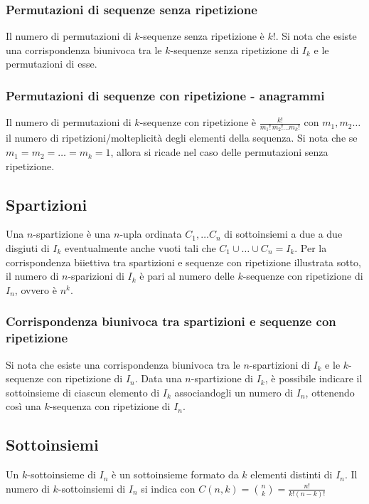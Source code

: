 \documentclass[a4paper]{article}
\begin{document}
\subsubsection*{Permutazioni di sequenze senza ripetizione}
Il numero di permutazioni di \(k\)-sequenze senza ripetizione è \(k!\). Si nota che esiste una corrispondenza biunivoca tra le
\(k\)-sequenze senza ripetizione di \(I_k\) e le permutazioni di esse.

\subsubsection*{Permutazioni di sequenze con ripetizione - anagrammi}
Il numero di permutazioni di \(k\)-sequenze con ripetizione è \(\frac{k!}{m_1 \!! \, m_2\!! \dots m_k\!!}\) con \(m_1, m_2\dots\)
il numero di ripetizioni/molteplicità degli elementi della sequenza. Si nota che se \(m_1 = m_2 = \dots = m_k = 1\), allora si
ricade nel caso delle permutazioni senza ripetizione.

\subsection{Spartizioni}
Una \(n\)-spartizione è una \(n\)-upla ordinata \(C_1, \dots C_n\) di sottoinsiemi a due a due disgiuti di \(I_k\) eventualmente
anche vuoti tali che \(C_1 \cup \dots \cup C_n = I_k\). Per la corrispondenza biiettiva tra spartizioni e sequenze con ripetizione
illustrata sotto, il numero di \(n\)-sparizioni di \(I_k\) è pari al numero delle \(k\)-sequenze con ripetizione di \(I_n\), ovvero
è \(n^k\).

\subsubsection*{Corrispondenza biunivoca tra spartizioni e sequenze con ripetizione}
Si nota che esiste una corrispondenza biunivoca tra le \(n\)-spartizioni di \(I_k\) e le \(k\)-sequenze con ripetizione di \(I_n\).
Data una \(n\)-spartizione di \(I_k\), è possibile indicare il sottoinsieme di ciascun elemento di \(I_k\) associandogli un numero
di \(I_n\), ottenendo così una \(k\)-sequenza con ripetizione di \(I_n\).

\subsection{Sottoinsiemi}
Un \(k\)-sottoinsieme di \(I_n\) è un sottoinsieme formato da \(k\) elementi distinti di \(I_n\). Il numero di \(k\)-sottoinsiemi
di \(I_n\) si indica con \(\displaystyle C(n,k) = \binom{n}{k} = \frac{n!}{k! (n-k)!}\)
\end{document}
